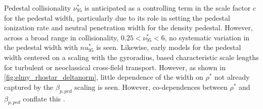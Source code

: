 \begin{figure}
 \pushtooutside
\end{figure}

Pedestal collisionality $\nu^*_{95}$ is anticipated as a controlling term in the scale factor $c$ for the pedestal width, particularly due to its role in setting the pedestal ionization rate and neutral penetration width for the density pedestal.  However, across a broad range in collisionality, $0.25 < \nu^*_{95} < 6$, no systematic variation in the pedestal width with $nu^*_{95}$ is seen.  Likewise, early models for the pedestal width centered on a scaling with the gyroradius, based characteristic scale lengths for turbulent or neoclassical cross-field transport.  However, as shown in \cref{fig:elmy_rhostar_deltanorm}, little dependence of the width on $\rho^*$ not already captured by the $\beta_{p,ped}$ scaling is seen.  However, co-dependences between $\rho^*$ and $\beta_{p,ped}$ conflate this .

